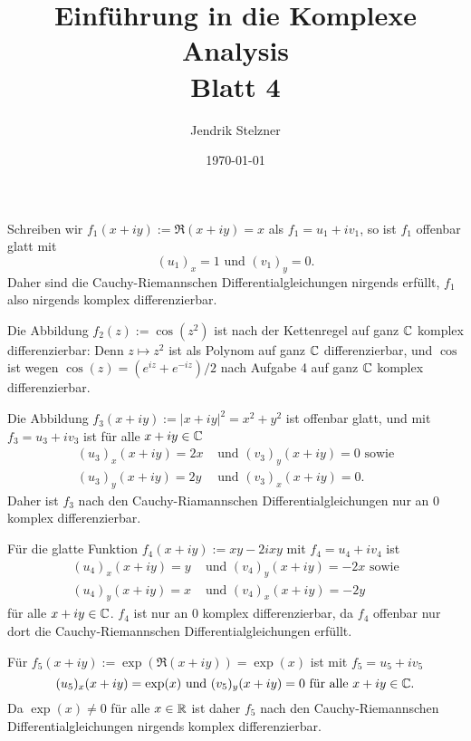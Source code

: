 \documentclass[a4paper,10pt]{article}
\title{\sc Einführung in die Komplexe Analysis \\ \Large Blatt 4}
\author{Jendrik Stelzner}
\date{\today}
\begin{document}
\maketitle






\addtocounter{section}{1}





\section{}
Schreiben wir $f_1(x+iy) := \Re(x+iy) = x$ als $f_1 = u_1+iv_1$, so ist $f_1$ offenbar glatt mit
\[
 (u_1)_x = 1 \text{ und } (v_1)_y = 0.
\]
Daher sind die Cauchy-Riemannschen Differentialgleichungen nirgends erfüllt, $f_1$ also nirgends komplex differenzierbar.


Die Abbildung $f_2(z) := \cos(z^2)$ ist nach der Kettenregel auf ganz $\mathbb{C}$ komplex differenzierbar: Denn $z \mapsto z^2$ ist als Polynom auf ganz $\mathbb{C}$ differenzierbar, und $\cos$ ist wegen $\cos(z) = (e^{iz}+e^{-iz})/2$ nach Aufgabe 4 auf ganz $\mathbb{C}$ komplex differenzierbar.


Die Abbildung $f_3(x+iy) := |x+iy|^2 = x^2 + y^2$ ist offenbar glatt, und mit $f_3 = u_3+iv_3$ ist für alle $x+iy \in \mathbb{C}$
\begin{align*}
 (u_3)_x(x+iy) = 2x &\text{ und } (v_3)_y(x+iy) = 0 \text{ sowie} \\
 (u_3)_y(x+iy) = 2y &\text{ und } (v_3)_x(x+iy) = 0.
\end{align*}
Daher ist $f_3$ nach den Cauchy-Riamannschen Differentialgleichungen nur an $0$ komplex differenzierbar.


Für die glatte Funktion $f_4(x+iy) := xy-2ixy$ mit $f_4 = u_4+iv_4$ ist
\begin{align*}
 (u_4)_x(x+iy) = y &\text{ und } (v_4)_y(x+iy) = -2x \text{ sowie} \\
 (u_4)_y(x+iy) = x &\text{ und } (v_4)_x(x+iy) = -2y
\end{align*}
für alle $x+iy \in \mathbb{C}$. $f_4$ ist nur an $0$ komplex differenzierbar, da $f_4$ offenbar nur dort die Cauchy-Riemannschen Differentialgleichungen erfüllt.


Für $f_5(x+iy) := \exp(\Re(x+iy)) = \exp(x)$ ist mit $f_5 = u_5+iv_5$
\[
 (u_5)_x(x+iy) = \exp(x) \text{ und } (v_5)_y(x+iy) = 0 \text{ für alle } x+iy \in \mathbb{C}.
\]
Da $\exp(x) \neq 0$ für alle $x \in \mathbb{R}$ ist daher $f_5$ nach den Cauchy-Riemannschen Differentialgleichungen nirgends komplex differenzierbar.
\end{document}
